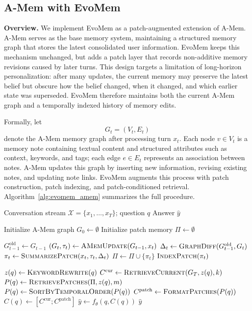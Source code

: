 \documentclass{article}
\begin{document}
\subsection{A-Mem with EvoMem}
\label{sec:evomem_amem}

\textbf{Overview.}
We implement EvoMem as a patch-augmented extension of A-Mem. A-Mem serves as the base memory system, maintaining a structured memory graph that stores the latest consolidated user information. EvoMem keeps this mechanism unchanged, but adds a patch layer that records non-additive memory revisions caused by later turns. This design targets a limitation of long-horizon personalization: after many updates, the current memory may preserve the latest belief but obscure how the belief changed, when it changed, and which earlier state was superseded. EvoMem therefore maintains both the current A-Mem graph and a temporally indexed history of memory edits.

Formally, let
\[
G_t=(V_t,E_t)
\]
denote the A-Mem memory graph after processing turn $x_t$. Each node $v\in V_t$ is a memory note containing textual content and structured attributes such as context, keywords, and tags; each edge $e\in E_t$ represents an association between notes. A-Mem updates this graph by inserting new information, revising existing notes, and updating note links. EvoMem augments this process with patch construction, patch indexing, and patch-conditioned retrieval. Algorithm~\ref{alg:evomem_amem} summarizes the full procedure.

\begin{algorithm}[H]
\caption{EvoMem: Patch-Augmented A-Mem}
\label{alg:evomem_amem}
\begin{algorithmic}[1]
\Require Conversation stream $\mathcal{X}=\{x_1,\ldots,x_T\}$; question $q$
\Ensure Answer $\hat{y}$

\State Initialize A-Mem graph $G_0 \gets \emptyset$
\State Initialize patch memory $\Pi \gets \emptyset$

    \State $G_{t-1}^{\mathrm{old}} \gets G_{t-1}$
    \State $(G_t,\tau_t) \gets \textsc{AMemUpdate}(G_{t-1}, x_t)$
    \State $\Delta_t \gets \textsc{GraphDiff}(G_{t-1}^{\mathrm{old}}, G_t)$
        \State $\pi_t \gets \textsc{SummarizePatch}(x_t,\tau_t,\Delta_t)$
        \State $\Pi \gets \Pi \cup \{\pi_t\}$
        \State $\textsc{IndexPatch}(\pi_t)$
    \EndIf
\EndFor

\State $z(q) \gets \textsc{KeywordRewrite}(q)$
\State $C^{\mathrm{cur}} \gets \textsc{RetrieveCurrent}(G_T,z(q),k)$
\State $P(q) \gets \textsc{RetrievePatches}(\Pi,z(q),m)$
\State $P(q) \gets \textsc{SortByTemporalOrder}(P(q))$
\State $C^{\mathrm{patch}} \gets \textsc{FormatPatches}(P(q))$
\State $C(q) \gets [C^{\mathrm{cur}}; C^{\mathrm{patch}}]$
\State $\hat{y} \gets f_\theta(q,C(q))$
\State \Return $\hat{y}$
\end{algorithmic}
\end{algorithm}
\end{document}
